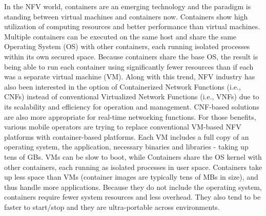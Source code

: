 


In the NFV world, containers are an emerging technology and the paradigm is standing between virtual machines and containers now. Containers show high utilization of computing resources and better performance than virtual machines. Multiple containers can be executed on the same host and share the same Operating System (OS) with other containers, each running isolated processes within its own secured space. Because containers share the base OS, the result is being able to run each container using significantly fewer resources than if each was a separate virtual machine (VM). Along with this trend, NFV industry has also been interested in the option of Containerized Network Functions (i.e., CNFs) instead of conventional Virtualized Network Functions (i.e., VNFs) due to its scalability and efficiency for operation and management. CNF-based solutions are also more appropriate for real-time networking functions. For those benefits, various mobile operators are trying to replace conventional VM-based NFV platforms with container-based platforms. 
Each VM includes a full copy of an operating system, the application, necessary binaries and libraries - taking up tens of GBs. VMs can be slow to boot, while Containers share the OS kernel with other containers, each running as isolated processes in user space. Containers take up less space than VMs (container images are typically tens of MBs in size), and thus handle more applications. Because they do not include the operating system, containers require fewer system resources and less overhead. They also tend to be faster to start/stop and they are ultra-portable across environments.


